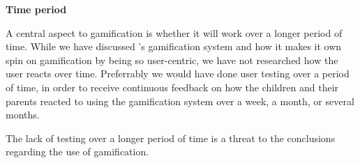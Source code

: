 \textbf{Time period}

A central aspect to gamification is whether it will work over a longer period of time. While we have discussed \app{}'s gamification system and how it makes it own spin on gamification by being so user-centric, we have not researched how the user reacts over time. Preferrably we would have done user testing over a period of time, in order to receive continuous feedback on how the children and their parents reacted to using the gamification system over a week, a month, or several months. 

The lack of testing over a longer period of time is a threat to the conclusions regarding the use of gamification. 

